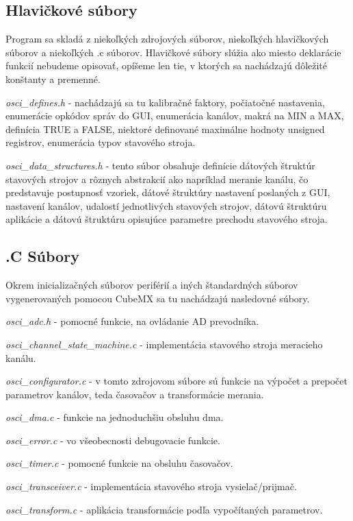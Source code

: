 \documentclass[main.tex]{subfiles}
\begin{document}
\begin{multicols*}{2}
			
			\vskip 0.25cm
			
			
			\subsection{Hlavičkové súbory}
			Program sa skladá z niekoľkých zdrojových súborov, niekoľkých hlavičkových súborov a niekoľkých .c súborov. Hlavičkové súbory slúžia ako miesto deklarácie funkcií nebudeme opisovať, opíšeme len tie, v ktorých sa nachádzajú dôležité konštanty a premenné.
			
			\textit{osci\_defines.h } - nachádzajú sa tu kalibračné faktory, počiatočné nastavenia, enumerácie opkódov správ do GUI, enumerácia kanálov, makrá na MIN a MAX, definícia TRUE a FALSE, niektoré definované maximálne hodnoty unsigned registrov, enumerácia typov stavového stroja.
			
			\textit{osci\_data\_structures.h} - tento súbor obsahuje definície dátových štruktúr stavových strojov a rôznych abstrakcií ako napríklad meranie kanálu, čo predstavuje postupnosť vzoriek, dátové štruktúry nastavení poslaných z GUI, nastavení kanálov, udalostí jednotlivých stavových strojov, dátovú štruktúru aplikácie a dátovú štruktúru opisujúce parametre prechodu stavového stroja.
			\subsection{.C Súbory}
			Okrem inicializačných súborov periférií a iných štandardných súborov vygenerovaných pomocou CubeMX sa tu nachádzajú nasledovné súbory.
			
			\textit{ osci\_adc.h} - pomocné funkcie, na ovládanie AD prevodníka. 
			
			\textit{ osci\_channel\_state\_machine.c} - implementácia stavového stroja meracieho kanálu. 
			
			\textit{ osci\_configurator.c} - v tomto zdrojovom súbore sú funkcie na výpočet a prepočet parametrov kanálov, teda časovačov a transformácie merania. 
			
			\textit{ osci\_dma.c} - funkcie na jednoduchšiu obsluhu dma. 
			
			\textit{ osci\_error.c} - vo všeobecnosti debugovacie funkcie.
			
			\textit{ osci\_timer.c} - pomocné funkcie na obsluhu časovačov. 
			
			\textit{ osci\_transceiver.c} - implementácia stavového stroja vysielač/prijmač.
			
			\textit{ osci\_transform.c} - aplikácia transformácie podľa vypočítaných parametrov.
			

\end{multicols*}
\end{document}
